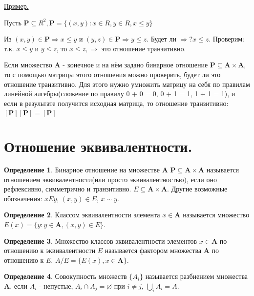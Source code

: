 \documentclass[12pt, a4paper, oneside]{article}
\theoremstyle{plain} %
\theoremstyle{definition}
\newtheorem*{definition}{Определение}  %
\begin{document}
\underline{Пример.}


Пусть $\textbf{P} \subseteq R^2, \textbf{P} = \{(x,y):x \in R, y \in R, x \leq y\}$


Из $(x,y) \in \textbf{P} \Rightarrow x \leq y$ и $(y,z) \in \textbf{P} \Rightarrow y \leq z$. Будет ли $\Rightarrow? x \leq z$. Проверим: т.к. $x \leq y$ и $y \leq z$, то $x \leq z, \Rightarrow$ это отношение транзитивно.\par


Если множество \textbf{A} - конечное и на нём задано бинарное отношение $\textbf{P} \subseteq \textbf{A} \times \textbf{A}$, то с помощью матрицы этого отношения можно проверить, будет ли это отношение транзитивно. Для этого нужно умножить матрицу на себя по правилам линейной алгебры(сложение по правилу 0 + 0 = 0, 0 + 1 = 1, 1 + 1 = 1), и если в результате получится исходная матрица, то отношение транзитивно: $[\textbf{P}][\textbf{P}] = [\textbf{P}]$

\section{Отношение эквивалентности.}

\begin{definition}
Бинарное отношение на множестве \textbf{A} $\textbf{P} \subseteq \textbf{A} \times \textbf{A}$ называется отношением эквивалентности(или просто эквивалентностью), если оно рефлексивно, симметрично и транзитивно. $E \subseteq \textbf{A} \times \textbf{A}$. Другие возможные обозначения: $xEy$, $(x,y) \in E$, $x \sim y$.
\end{definition}

\begin{definition}
Классом эквивалентности элемента $x \in \textbf{A}$ называется множество $E(x) = \{y: y \in \textbf{A}, (x,y) \in E\}$.
\end{definition}

\begin{definition}
Множество классов эквивалентности элементов $x \in \textbf{A}$ по отношению к эквивалентности $E$ называется фактором множества \textbf{A} по отношению к $E$. $A/E = \{E(x), x \in \textbf{A}\}$. 
\end{definition}

\begin{definition}
Совокупность множеств $\{A_i\}$ называется разбиением множества \textbf{A}, если $A_i$ - непустые, $A_i \cap A_j = \varnothing$ при $i \neq j$, $\bigcup_{i}A_i = A$.
\end{definition}
\end{document}
